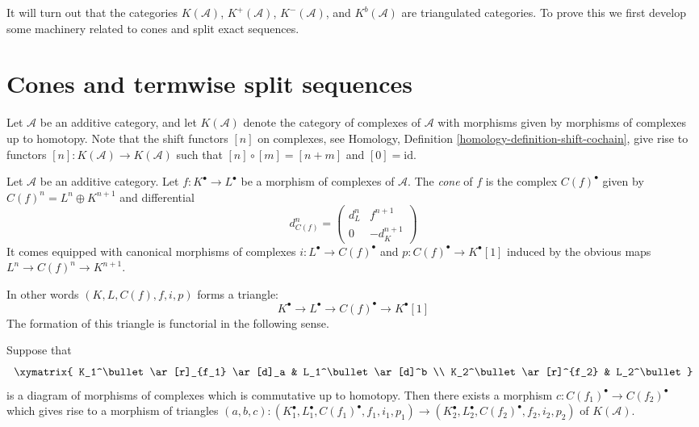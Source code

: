 \noindent
It will turn out that the categories $K(\mathcal{A})$,
$K^{+}(\mathcal{A})$, $K^{-}(\mathcal{A})$, and $K^b(\mathcal{A})$
are triangulated categories. To prove this we first develop
some machinery related to cones and split exact sequences.




\section{Cones and termwise split sequences}
\label{section-cones}

\noindent
Let $\mathcal{A}$ be an additive category, and let
$K(\mathcal{A})$ denote the category of complexes of
$\mathcal{A}$ with morphisms given by morphisms of
complexes up to homotopy. Note that the shift functors
$[n]$ on complexes, see
Homology, Definition \ref{homology-definition-shift-cochain},
give rise to functors $[n] : K(\mathcal{A}) \to K(\mathcal{A})$
such that $[n] \circ [m] = [n + m]$ and $[0] = \text{id}$.

\begin{definition}
\label{definition-cone}
Let $\mathcal{A}$ be an additive category.
Let $f : K^\bullet \to L^\bullet$ be a morphism of
complexes of $\mathcal{A}$. The {\it cone} of $f$
is the complex $C(f)^\bullet$ given by
$C(f)^n = L^n \oplus K^{n + 1}$ and
differential
$$
d_{C(f)}^n =
\left(
\begin{matrix}
d^n_L & f^{n + 1} \\
0 & -d_K^{n + 1}
\end{matrix}
\right)
$$
It comes equipped with canonical morphisms of complexes
$i : L^\bullet \to C(f)^\bullet$ and $p : C(f)^\bullet \to K^\bullet[1]$
induced by the obvious maps $L^n \to C(f)^n \to K^{n + 1}$.
\end{definition}

\noindent
In other words $(K, L, C(f), f, i, p)$ forms a triangle:
$$
K^\bullet \to L^\bullet \to C(f)^\bullet \to K^\bullet[1]
$$
The formation of this triangle is
functorial in the following sense.

\begin{lemma}
\label{lemma-functorial-cone}
Suppose that
$$
\xymatrix{
K_1^\bullet \ar[r]_{f_1} \ar[d]_a & L_1^\bullet \ar[d]^b \\
K_2^\bullet \ar[r]^{f_2} & L_2^\bullet
}
$$
is a diagram of morphisms of complexes which is commutative
up to homotopy. Then there exists a morphism
$c : C(f_1)^\bullet \to C(f_2)^\bullet$ which gives rise to
a morphism of triangles
$(a, b, c) : (K_1^\bullet, L_1^\bullet, C(f_1)^\bullet, f_1, i_1, p_1)
\to
(K_2^\bullet, L_2^\bullet, C(f_2)^\bullet, f_2, i_2, p_2)$
of $K(\mathcal{A})$.
\end{lemma}

